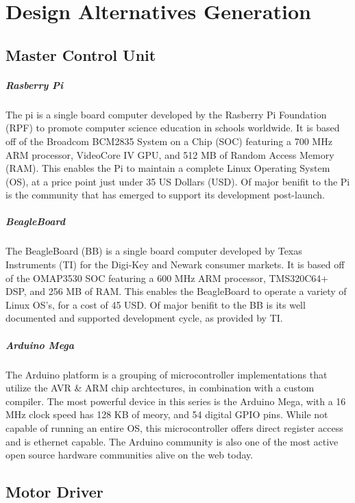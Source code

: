 \chapter{Design Alternatives Generation}
\section{Master Control Unit}
\paragraph{Rasberry Pi} 
The \gls{pi} is a single board computer developed by the Rasberry Pi Foundation (RPF) to promote computer science education in schools worldwide. 
It is based off of the Broadcom BCM2835 System on a Chip (SOC) featuring a 700 MHz ARM processor, VideoCore IV GPU, and 512 MB of Random Access Memory (RAM). 
This enables the Pi to maintain a complete Linux Operating System (OS), at a price point just under 35 US Dollars (USD). 
Of major beniﬁt to the Pi is the community that has emerged to support its development post-launch.

\paragraph{BeagleBoard}
The BeagleBoard (BB) is a single board computer developed by Texas Instruments (TI) for the Digi-Key and Newark consumer markets. 
It is based off of the OMAP3530 SOC featuring a 600 MHz ARM processor, TMS320C64+ DSP, and 256 MB of RAM.
This enables the BeagleBoard to operate a variety of Linux OS’s, for a cost of 45 USD. 
Of major beniﬁt to the BB is its well documented and supported development cycle, as provided by TI.

\paragraph{Arduino Mega} 
The Arduino platform is a grouping of microcontroller implementations that utilize the AVR \& ARM chip archtectures, in combination with a custom compiler. 
The most powerful device in this series is the Arduino Mega, with a 16 MHz clock speed has 128 KB of meory, and 54 digital GPIO pins. 
While not capable of running an entire OS, this microcontroller offers direct register access and is ethernet capable. 
The Arduino community is also one of the most active open source hardware communities alive on the web today.

\section{Motor Driver}
